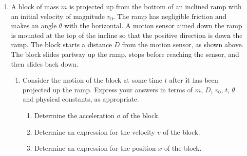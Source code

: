 \documentclass{../../../oss-apphys}
\begin{document}
\begin{enumerate}[leftmargin=15pt]
  \begin{center}
  \end{center}
\item A block of mass $m$ is projected up from the bottom of an inclined ramp
  with an initial velocity of magnitude $v_0$. The ramp has negligible friction
  and makes an angle $\theta$ with the horizontal. A motion sensor aimed down
  the ramp is mounted at the top of the incline so that the positive direction
  is down the ramp. The block starts a distance $D$ from the motion sensor, as
  shown above. The block slides partway up the ramp, stops before reaching the
  sensor, and then slides back down.
  \begin{enumerate}[leftmargin=15pt]
  \item Consider the motion of the block at some time $t$ after it has been
    projected up the ramp. Express your answers in terms of $m$, $D$, $v_0$,
    $t$, $\theta$ and physical constants, as appropriate.
    \begin{enumerate}[leftmargin=15pt]
    \item Determine the acceleration $a$ of the block.
    \item Determine an expression for the velocity $v$ of the block.
    \item Determine an expression for the position $x$ of the block.
    \end{enumerate}
    \newpage


\end{enumerate}
\end{enumerate}
\end{document}
